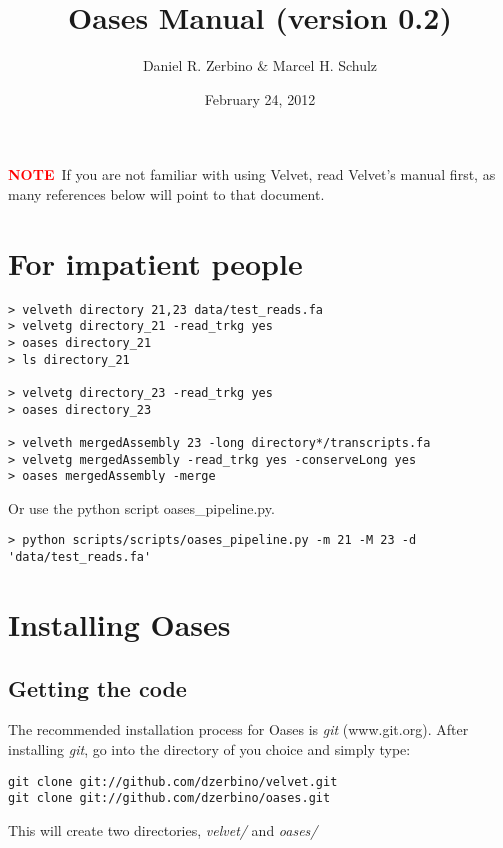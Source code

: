 \documentclass[12pt]{article}
\newcommand{\NOTE}{\textcolor{red}{\textbf{NOTE}}}
\begin{document}
\title{Oases Manual (version 0.2)}
\author{Daniel R. Zerbino \& Marcel H. Schulz}
\date{February 24, 2012}
\maketitle
\tableofcontents

\newpage

\NOTE\ If you are not familiar with using Velvet, read Velvet's manual first, as many references below will point to that document.

\section{For impatient people}
\begin{verbatim}
> velveth directory 21,23 data/test_reads.fa
> velvetg directory_21 -read_trkg yes
> oases directory_21
> ls directory_21

> velvetg directory_23 -read_trkg yes
> oases directory_23

> velveth mergedAssembly 23 -long directory*/transcripts.fa
> velvetg mergedAssembly -read_trkg yes -conserveLong yes
> oases mergedAssembly -merge
\end{verbatim}

Or use the python script oases\_pipeline.py.

\begin{verbatim}
> python scripts/scripts/oases_pipeline.py -m 21 -M 23 -d 'data/test_reads.fa'
\end{verbatim}

\section{Installing Oases} 

\subsection{Getting the code}

The recommended installation process for Oases is \emph{git} (www.git.org). After installing \emph{git}, go into the directory of you choice and simply type:

\begin{verbatim}
git clone git://github.com/dzerbino/velvet.git
git clone git://github.com/dzerbino/oases.git
\end{verbatim}

This will create two directories, \emph{velvet/} and \emph{oases/}
\end{document}
